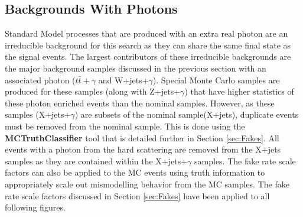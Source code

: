 %



\subsection{Backgrounds With Photons}
\label{sec:BKGPho}

Standard Model processes that are produced with an extra real photon are an irreducible background for this search as they can share the same final state as the signal events.  The largest contributors of these irreducible backgrounds are the major background samples discussed in the previous section with an associated photon ($t\bar{t}+\gamma$ and W+jets+$\gamma$).  Special Monte Carlo samples are produced for these samples (along with Z+jets+$\gamma$) that have higher statistics of these photon enriched events than the nominal samples.  However, as these samples (X+jets+$\gamma$) are subsets of the nominal sample(X+jets), duplicate events must be removed from the nominal sample.  This is done using the \textbf{MCTruthClassifier} tool that is detailed further in Section \ref{sec:Fakes}.  All events with a photon from the hard scattering are removed from the X+jets samples as they are contained within the X+jets+$\gamma$ samples.  The fake rate scale factors can also be applied to the MC events using truth information to appropriately scale out mismodelling behavior from the MC samples.  The fake rate scale factors discussed in Section \ref{sec:Fakes} have been applied to all following figures. 
